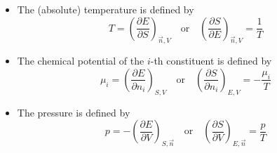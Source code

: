 \begin{defn}
    \par\indent
    \begin{itemize}
        \item The (absolute) temperature is defined by  
        \[
        T = \left( \frac{\partial E}{\partial S} \right)_{\vec{n}, V} \quad \text{or} \quad \left( \frac{\partial S}{\partial E} \right)_{\vec{n}, V} = \frac{1}{T}
        \]          
        \item The chemical potential of the \(i\)-th constituent is defined by  
        \[
        \mu_i = \left( \frac{\partial E}{\partial n_i} \right)_{S, V} \quad \text{or} \quad \left( \frac{\partial S}{\partial n_i} \right)_{E, V} = -\frac{\mu_i}{T}
        \]          
        \item The pressure is defined by  
        \[
        p = - \left( \frac{\partial E}{\partial V} \right)_{S, \vec{n}} \quad \text{or} \quad \left( \frac{\partial S}{\partial V} \right)_{E, \vec{n}} = \frac{p}{T}
        \]
    \end{itemize}
\end{defn}
